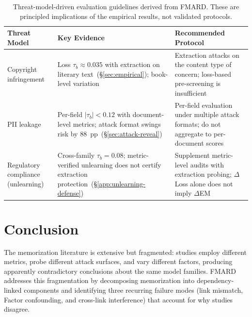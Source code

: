\documentclass[11pt]{article}
\begin{document}
\begin{table}[t]
\centering
\footnotesize
\begin{tabular}{@{}p{1.6cm}p{2.6cm}p{2.9cm}@{}}
\toprule
\textbf{Threat Model} & \textbf{Key Evidence} & \textbf{Recommended Protocol} \\
\midrule
Copyright infringement
  & Loss $\tau_b \approx 0.035$ with extraction on literary text~(\S\ref{sec:empirical}); book-level variation~\citep{cooper2025extractingmemorizedpiecescopyrighted}
  & Extraction attacks on the content type of concern; loss-based pre-screening is insufficient \\
\addlinespace
PII leakage
  & Per-field $|\tau_b| < 0.12$ with document-level metrics; attack format swings risk by 88~pp~(\S\ref{sec:attack-reveal})
  & Per-field evaluation under multiple attack formats; do not aggregate to per-document scores \\
\addlinespace
Regulatory compliance (unlearning)
  & Cross-family $\tau_b = 0.08$; metric-verified unlearning does not certify extraction protection~(\S\ref{app:unlearning-defense})
  & Supplement metric-level audits with extraction probing; $\Delta$Loss alone does not imply $\Delta$EM \\
\bottomrule
\end{tabular}
\caption{Threat-model-driven evaluation guidelines derived from FMARD.
These are principled implications of the empirical results, not validated
protocols.}
\label{tab:guidelines}
\end{table}


\section{Conclusion}
\label{sec:conclusion}

The memorization literature is extensive but fragmented: studies employ
different metrics, probe different attack surfaces, and vary different
factors, producing apparently contradictory conclusions about the same model
families.
FMARD addresses this fragmentation by decomposing memorization into dependency-linked
components and identifying three recurring failure modes (link mismatch,
Factor confounding, and cross-link interference) that account for why studies
disagree.
\end{document}
